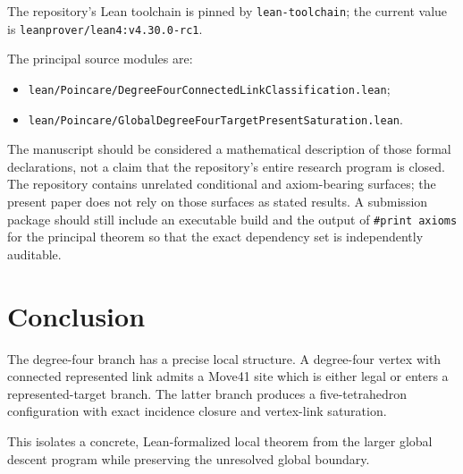 \documentclass[11pt]{article}
\theoremstyle{definition}
\theoremstyle{remark}
\begin{document}
The repository's Lean toolchain is pinned by \texttt{\small lean-toolchain}; the
current value is
\texttt{\small leanprover/lean4:v4.30.0-rc1}.

The principal source modules are:
\begin{itemize}
  \item \texttt{\small lean/Poincare/DegreeFourConnectedLinkClassification.lean};
  \item \texttt{\small lean/Poincare/GlobalDegreeFourTargetPresentSaturation.lean}.
\end{itemize}

The manuscript should be considered a mathematical description of those
formal declarations, not a claim that the repository's entire research
program is closed.  The repository contains unrelated conditional and
axiom-bearing surfaces; the present paper does not rely on those surfaces
as stated results.  A submission package should still include an executable
build and the output of \texttt{\small\#print axioms} for the principal
 theorem so that the exact dependency set is independently auditable.

\section{Conclusion}

The degree-four branch has a precise local structure.  A degree-four
vertex with connected represented link admits a Move41 site which is either
legal or enters a represented-target branch.  The latter branch produces a
five-tetrahedron configuration with exact incidence closure and vertex-link
saturation.

This isolates a concrete, Lean-formalized local theorem from the larger
global descent program while preserving the unresolved global boundary.
\end{document}
